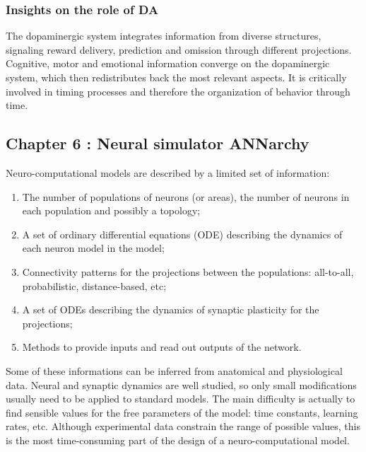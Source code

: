 \documentclass[
  11pt,
  a4paper,
]{scrbook}
\providecommand{\tightlist}{%
  \setlength{\itemsep}{0pt}\setlength{\parskip}{0pt}}\usepackage{longtable,booktabs,array}
\begin{document}
\subsubsection*{Insights on the role of
DA}\label{insights-on-the-role-of-da-3}

The dopaminergic system integrates information from diverse structures,
signaling reward delivery, prediction and omission through different
projections. Cognitive, motor and emotional information converge on the
dopaminergic system, which then redistributes back the most relevant
aspects. It is critically involved in timing processes and therefore the
organization of behavior through time.

\subsection{Chapter 6 : Neural simulator
ANNarchy}\label{chapter-6-neural-simulator-annarchy}

Neuro-computational models are described by a limited set of
information:

\begin{enumerate}
\def\labelenumi{\arabic{enumi}.}
\tightlist
\item
  The number of populations of neurons (or areas), the number of neurons
  in each population and possibly a topology;
\item
  A set of ordinary differential equations (ODE) describing the dynamics
  of each neuron model in the model;
\item
  Connectivity patterns for the projections between the populations:
  all-to-all, probabilistic, distance-based, etc;
\item
  A set of ODEs describing the dynamics of synaptic plasticity for the
  projections;
\item
  Methods to provide inputs and read out outputs of the network.
\end{enumerate}

Some of these informations can be inferred from anatomical and
physiological data. Neural and synaptic dynamics are well studied, so
only small modifications usually need to be applied to standard models.
The main difficulty is actually to find sensible values for the free
parameters of the model: time constants, learning rates, etc. Although
experimental data constrain the range of possible values, this is the
most time-consuming part of the design of a neuro-computational model.
\end{document}
